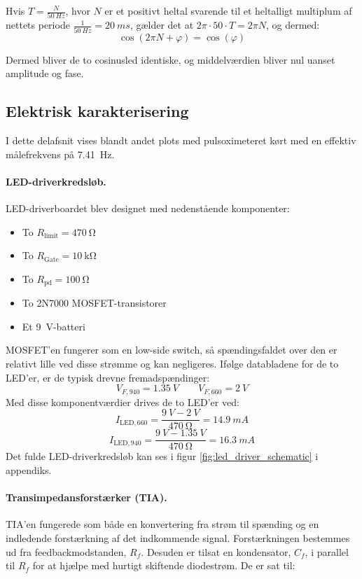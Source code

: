 Hvis $T = \frac{N}{\SI{50}{Hz}}$, hvor $N$ er et positivt heltal svarende til et heltalligt multiplum af nettets periode $\frac{1}{\SI{50}{Hz}} = \SI{20}{ms}$, gælder det at $2\pi \cdot 50 \cdot T = 2\pi N$, og dermed:
\begin{equation}
\label{eq:midling_50Hz_cos}
    \cos(2\pi N + \varphi) = \cos(\varphi)
\end{equation}

Dermed bliver de to cosinusled identiske, og middelværdien bliver nul uanset amplitude og fase.

\subsection{Elektrisk karakterisering}
I dette delafsnit vises blandt andet plots med pulsoximeteret kørt med en effektiv målefrekvens på \SI{7.41}{Hz}.

\paragraph{LED-driverkredsløb.}
LED-driverboardet blev designet med nedenstående komponenter:
\begin{itemize}
    \item To $R_{\text{limit}} = \SI{470}{\ohm}$
    \item To $R_{\text{Gate}} = \SI{10}{\kilo\ohm}$
    \item To $R_{\text{pd}} = \SI{100}{\ohm}$
    \item To 2N7000 MOSFET-transistorer
    \item Et \SI{9}{V}-batteri
\end{itemize}

MOSFET'en fungerer som en low-side switch, så spændingsfaldet over den er relativt lille ved disse strømme og kan negligeres. Ifølge databladene for de to LED'er, er de typisk drevne fremadspændinger:
\[V_{F,940} = \SI{1.35}{V} \qquad V_{F,660} = \SI{2}{V}\]
Med disse komponentværdier drives de to LED'er ved:
\begin{equation}
    I_{\mathrm{LED},660} = \frac{\SI{9}{V}-\SI{2}{V}}{\SI{470}{\ohm}} = \SI{14.9}{mA}
\end{equation}
\begin{equation}
    I_{\mathrm{LED},940} = \frac{\SI{9}{V}-\SI{1.35}{V}}{\SI{470}{\ohm}} = \SI{16.3}{mA}
\end{equation}
Det fulde LED-driverkredsløb kan ses i figur \ref{fig:led_driver_schematic} i appendiks.

\paragraph{Transimpedansforstærker (TIA).}
TIA'en fungerede som både en konvertering fra strøm til spænding og en indledende forstærkning af det indkommende signal. Forstærkningen bestemmes ud fra feedbackmodstanden, $R_f$. Desuden er tilsat en kondensator, $C_f$, i parallel til $R_f$ for at hjælpe med hurtigt skiftende diodestrøm. De er sat til:

